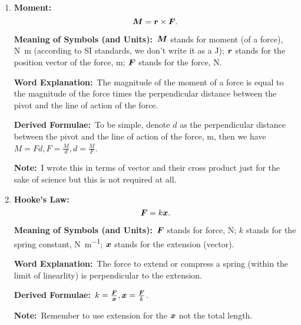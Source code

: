 \documentclass[8pt]{article}
\newcommand{\MeanSymb}{\textbf{Meaning of Symbols (and Units):}\ }
\newcommand{\WordExpl}{\textbf{Word Explanation:}\ }
\newcommand{\DeriForm}{\textbf{Derived Formulae:}\ }
\newcommand{\Note}{\textbf{Note:}\ }
\begin{document}
\begin{enumerate}
                \WordExpl Impulse is equal to the change in momentum.

                \DeriForm The following is derived from Newton's 2nd Law:
                \[
                    \vect{I} = \vect{F} \Delta t.
                \]

                \Note This is only meaningful if momentum is conserved - just like work and energy.

                \item \textbf{Moment:}
                \[
                    \boldsymbol{M} = \boldsymbol{r} \times \boldsymbol{F}.
                \]

                \MeanSymb \(\boldsymbol{M}\) stands for moment (of a force), \unit{\newton \metre} (according to SI standards, we don't write it as a \unit{\joule}); \(\boldsymbol{r}\) stands for the position vector of the force, \unit{\metre}; \(\boldsymbol{F}\) stands for the force, \unit{\newton}.

                \WordExpl The magnitude of the moment of a force is equal to the magnitude of the force times the perpendicular distance between the pivot and the line of action of the force.

                \DeriForm To be simple, denote \(d\) as the perpendicular distance between the pivot and the line of action of the force, \unit{\metre}, then we have \(M = Fd, F = \frac{M}{d}, d = \frac{M}{F}\).

                \Note I wrote this in terms of vector and their cross product just for the sake of science but this is not required at all.

                \item \textbf{Hooke's Law:}
                \[
                    \boldsymbol{F} = k \boldsymbol{x}.
                \]

                \MeanSymb \(\boldsymbol{F}\) stands for force, \unit{\newton}; \(k\) stands for the spring constant, \unit{\newton \per \metre}; \(\boldsymbol{x}\) stands for the extension (vector).

                \WordExpl The force to extend or compress a spring (within the limit of linearlity) is perpendicular to the extension.

                \DeriForm \(k = \frac{\boldsymbol{F}}{\boldsymbol{x}}, \boldsymbol{x} = \frac{\boldsymbol{F}}{k}\).

                \Note Remember to use extension for the \(\boldsymbol{x}\) not the total length.
            \end{enumerate}
\end{document}
